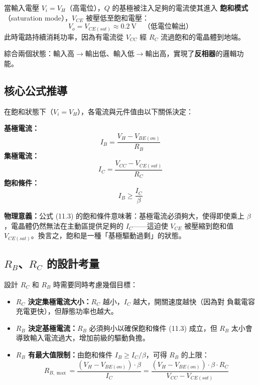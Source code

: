 \documentclass[12pt]{article}
\begin{document}
\begin{keybox}[飽和模式（$V_i = V_H$）]
當輸入電壓 $V_i = V_H$（高電位），$Q$ 的基極被注入足夠的電流使其進入
\textbf{飽和模式}（saturation mode），$V_{CE}$ 被壓低至飽和電壓：
\[
V_o = V_{CE(sat)} \approx 0.2\ \text{V} \quad \text{（低電位輸出）}
\]
此時電路持續消耗功率，因為有電流從 $V_{CC}$ 經 $R_C$ 流過飽和的電晶體到地端。
\end{keybox}

\noindent
綜合兩個狀態：輸入高$\to$輸出低、輸入低$\to$輸出高，實現了\textbf{反相器}的邏輯功能。

\subsection*{核心公式推導}

在飽和狀態下（$V_i = V_H$），各電流與元件值由以下關係決定：

\begin{formulabox}
\textbf{基極電流：}
\[
I_B = \frac{V_H - V_{BE(on)}}{R_B} \tag{11.1}
\]
\textbf{集極電流：}
\[
I_C = \frac{V_{CC} - V_{CE(sat)}}{R_C} \tag{11.2}
\]
\textbf{飽和條件：}
\[
I_B \ge \frac{I_C}{\beta} \tag{11.3}
\]
\end{formulabox}

\noindent\textbf{物理意義：}公式 (11.3) 的飽和條件意味著：基極電流必須夠大，使得即使乘上
$\beta$，電晶體仍然無法在主動區提供足夠的 $I_C$——這迫使 $V_{CE}$ 被壓縮到飽和值
$V_{CE(sat)}$。換言之，飽和是一種「基極驅動過剩」的狀態。

\subsection*{$R_B$、$R_C$ 的設計考量}

設計 $R_C$ 和 $R_B$ 時需要同時考慮幾個目標：
\begin{itemize}[leftmargin=2.2em,itemsep=2pt]
\item \textbf{$R_C$ 決定集極電流大小：}$R_C$ 越小，$I_C$ 越大，開關速度越快（因為對
  負載電容充電更快），但靜態功率也越大。
\item \textbf{$R_B$ 決定基極電流：}$R_B$ 必須夠小以確保飽和條件 (11.3) 成立，但 $R_B$
  太小會導致輸入電流過大，增加前級的驅動負擔。
\item \textbf{$R_B$ 有最大值限制：}由飽和條件 $I_B \ge I_C/\beta$，可得 $R_B$ 的上限：
  \[
  R_{B,\max} = \frac{(V_H - V_{BE(on)}) \cdot \beta}{I_C}
    = \frac{(V_H - V_{BE(on)}) \cdot \beta \cdot R_C}{V_{CC} - V_{CE(sat)}}
  \]
\end{itemize}
\end{document}
